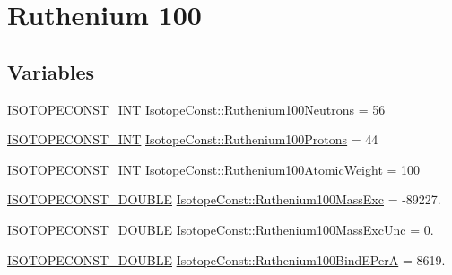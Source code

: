 \hypertarget{group___isotope_const-_ruthenium-_ru100}{}\section{Ruthenium 100}
\label{group___isotope_const-_ruthenium-_ru100}
\subsection*{Variables}
\begin{DoxyCompactItemize}
\item 
\mbox{\hyperlink{group___isotope_const-_macros_ga5f18360b3e99483a35c32d789e62621c}{I\+S\+O\+T\+O\+P\+E\+C\+O\+N\+S\+T\+\_\+\+I\+NT}} \mbox{\hyperlink{group___isotope_const-_ruthenium-_ru100_gad77ca6391de8ee8e981a2681191851d0}{Isotope\+Const\+::\+Ruthenium100\+Neutrons}} = 56
\item 
\mbox{\hyperlink{group___isotope_const-_macros_ga5f18360b3e99483a35c32d789e62621c}{I\+S\+O\+T\+O\+P\+E\+C\+O\+N\+S\+T\+\_\+\+I\+NT}} \mbox{\hyperlink{group___isotope_const-_ruthenium-_ru100_gaf8d54aa8e76f39b4041509f1ff419e8f}{Isotope\+Const\+::\+Ruthenium100\+Protons}} = 44
\item 
\mbox{\hyperlink{group___isotope_const-_macros_ga5f18360b3e99483a35c32d789e62621c}{I\+S\+O\+T\+O\+P\+E\+C\+O\+N\+S\+T\+\_\+\+I\+NT}} \mbox{\hyperlink{group___isotope_const-_ruthenium-_ru100_gaa76abbbf0d864b44543ec0c791966f2a}{Isotope\+Const\+::\+Ruthenium100\+Atomic\+Weight}} = 100
\item 
\mbox{\hyperlink{group___isotope_const-_macros_ga8f45a7272ce02c0b4c65c44636ed719a}{I\+S\+O\+T\+O\+P\+E\+C\+O\+N\+S\+T\+\_\+\+D\+O\+U\+B\+LE}} \mbox{\hyperlink{group___isotope_const-_ruthenium-_ru100_ga0db91cba03999ad32d242dc4fa264141}{Isotope\+Const\+::\+Ruthenium100\+Mass\+Exc}} = -\/89227.
\item 
\mbox{\hyperlink{group___isotope_const-_macros_ga8f45a7272ce02c0b4c65c44636ed719a}{I\+S\+O\+T\+O\+P\+E\+C\+O\+N\+S\+T\+\_\+\+D\+O\+U\+B\+LE}} \mbox{\hyperlink{group___isotope_const-_ruthenium-_ru100_ga7e33f464b901ce0c458be10d165b0dac}{Isotope\+Const\+::\+Ruthenium100\+Mass\+Exc\+Unc}} = 0.
\item 
\mbox{\hyperlink{group___isotope_const-_macros_ga8f45a7272ce02c0b4c65c44636ed719a}{I\+S\+O\+T\+O\+P\+E\+C\+O\+N\+S\+T\+\_\+\+D\+O\+U\+B\+LE}} \mbox{\hyperlink{group___isotope_const-_ruthenium-_ru100_gaddaecc89de6ebbba5def6510688cf369}{Isotope\+Const\+::\+Ruthenium100\+Bind\+E\+PerA}} = 8619.
\item 

\end{DoxyCompactItemize}
